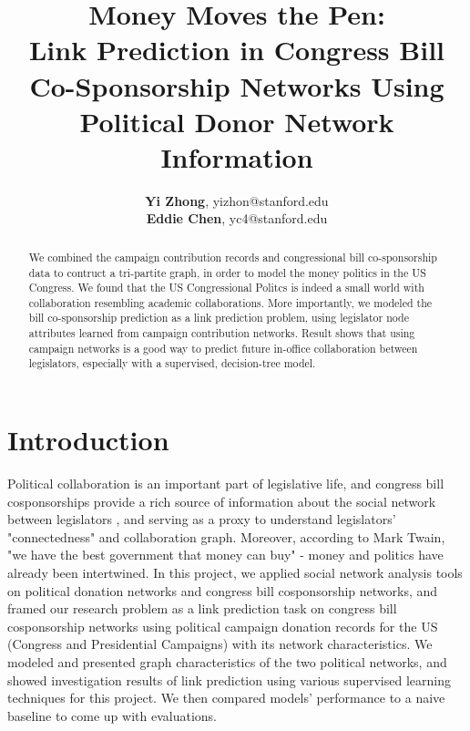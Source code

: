 \documentclass[12pt,twocolumn]{article}
\begin{document}
%
\title{Money Moves the Pen: \\ Link Prediction in Congress Bill Co-Sponsorship Networks Using Political Donor Network Information}


\author{\textbf{Yi Zhong}, yizhon@stanford.edu \\\textbf{Eddie Chen}, yc4@stanford.edu}

\maketitle

\begin{abstract}
We combined the campaign contribution records and congressional bill co-sponsorship data to contruct a tri-partite graph, in order to model the money politics in the US Congress. We found that the US Congressional Politcs is indeed a small world with collaboration resembling academic collaborations. More importantly, we modeled the bill co-sponsorship prediction as a link prediction problem, using legislator node attributes learned from campaign contribution networks. Result shows that using campaign networks is a good way to predict future in-office collaboration between legislators, especially with a supervised, decision-tree model. 
\end{abstract}
\section{Introduction}
Political collaboration is an important part of legislative life, and congress bill cosponsorships provide a rich source of information about the social network between legislators \cite{fowler2006connecting}, and serving as a proxy to understand legislators' "connectedness" and collaboration graph. Moreover, according to Mark Twain, "we have the best government that money can buy" - money and politics have already been intertwined. In this project, we applied social network analysis tools on political donation networks and congress bill cosponsorship networks, and framed our research problem as a link prediction task on congress bill cosponsorship networks using political campaign donation records for the US (Congress and Presidential Campaigns) with its network characteristics. We modeled and presented graph characteristics of the two political networks, and showed investigation results of link prediction using various supervised learning techniques for this project. We then compared models' performance to a naive baseline to come up with evaluations. 
\end{document}
